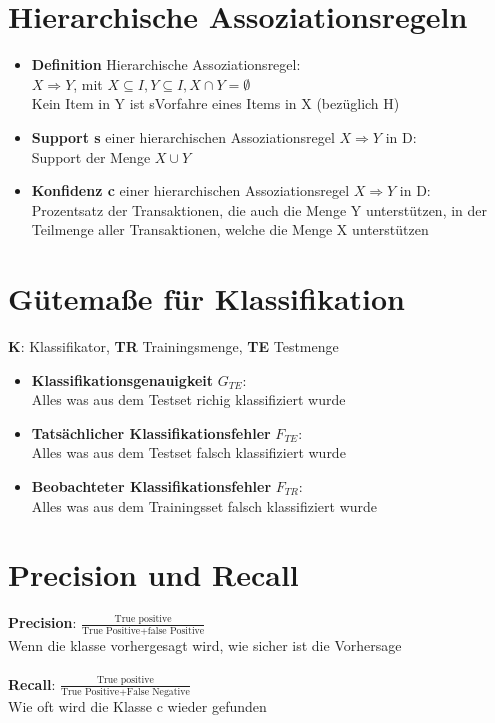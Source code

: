 \documentclass{article}
\begin{document}
\section{Hierarchische Assoziationsregeln}
\begin{itemize}
    \item \textbf{Definition} Hierarchische Assoziationsregel: \\
    $X \Rightarrow Y$, mit $X \subseteq I, Y \subseteq I, X \cap Y = \emptyset$ \\
    Kein Item in Y ist sVorfahre eines Items in X (bezüglich H)
    \item \textbf{Support s} einer hierarchischen Assoziationsregel
    $X \Rightarrow Y$ in D: \\
    Support der Menge $X \cup Y$
    \item \textbf{Konfidenz c} einer hierarchischen Assoziationsregel
    $X \Rightarrow Y$ in D: \\
    Prozentsatz der Transaktionen, die auch die Menge Y unterstützen,
    in der Teilmenge aller Transaktionen, welche die Menge X unterstützen
\end{itemize}
\section{Gütemaße für Klassifikation}
\textbf{K}: Klassifikator, \textbf{TR} Trainingsmenge, \textbf{TE} 
Testmenge
\begin{itemize}
    \item \textbf{Klassifikationsgenauigkeit} $G_{TE}$: \\
    Alles was aus dem Testset richig klassifiziert wurde
    \item \textbf{Tatsächlicher Klassifikationsfehler} $F_{TE}$: \\
    Alles was aus dem Testset falsch klassifiziert wurde
    \item \textbf{Beobachteter Klassifikationsfehler} $F_{TR}$: \\
    Alles was aus dem Trainingsset falsch klassifiziert wurde
\end{itemize}
\section{Precision und Recall}
\textbf{Precision}: $\frac{\text{True positive}}{\text{True Positive} + 
\text{false Positive}}$ \\
Wenn die klasse vorhergesagt wird, wie sicher ist die Vorhersage \\
\\
\textbf{Recall}: $\frac{\text{True positive}}{\text{True Positive} + 
\text{False Negative}}$ \\
Wie oft wird die Klasse c wieder gefunden
\end{document}
